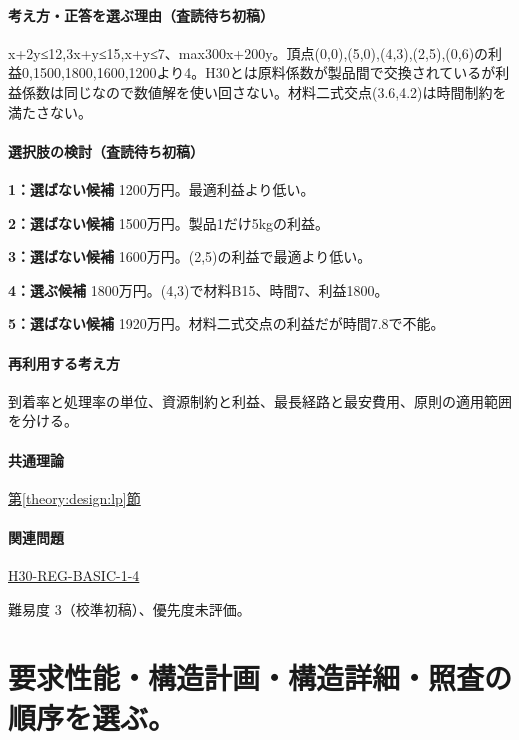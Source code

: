 \paragraph{考え方・正答を選ぶ理由（査読待ち初稿）} x+2y≤12,3x+y≤15,x+y≤7、max300x+200y。頂点(0,0),(5,0),(4,3),(2,5),(0,6)の利益0,1500,1800,1600,1200より4。H30とは原料係数が製品間で交換されているが利益係数は同じなので数値解を使い回さない。材料二式交点(3.6,4.2)は時間制約を満たさない。

\paragraph{選択肢の検討（査読待ち初稿）}\mbox{}\par

\noindent\textbf{1：選ばない候補} 1200万円。最適利益より低い。\par

\noindent\textbf{2：選ばない候補} 1500万円。製品1だけ5kgの利益。\par

\noindent\textbf{3：選ばない候補} 1600万円。(2,5)の利益で最適より低い。\par

\noindent\textbf{4：選ぶ候補} 1800万円。(4,3)で材料B15、時間7、利益1800。\par

\noindent\textbf{5：選ばない候補} 1920万円。材料二式交点の利益だが時間7.8で不能。\par

\paragraph{再利用する考え方} 到着率と処理率の単位、資源制約と利益、最長経路と最安費用、原則の適用範囲を分ける。

\paragraph{共通理論} \hyperref[theory:design:lp]{第\ref*{theory:design:lp}節}

\paragraph{関連問題} \hyperref[q:h30-reg-basic-1-4]{H30-REG-BASIC-1-4}

\par 難易度 3（校準初稿）、優先度未評価。

\section{要求性能・構造計画・構造詳細・照査の順序を選ぶ。}

